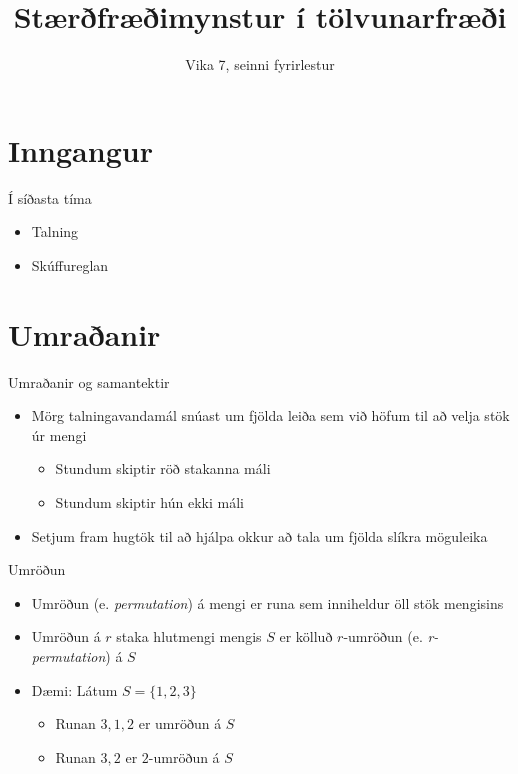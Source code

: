 \documentclass{beamer}
\title{Stærðfræðimynstur í tölvunarfræði}
\subtitle{Vika 7, seinni fyrirlestur}
\begin{document}
\begin{frame}
\titlepage
\end{frame}


\section{Inngangur}

\begin{frame}{Í síðasta tíma}
\begin{itemize}
 \item Talning
 \item Skúffureglan
\end{itemize}
\end{frame}

\section{Umraðanir}

\begin{frame}{Umraðanir og samantektir}
\begin{itemize}
 \item Mörg talningavandamál snúast um fjölda leiða sem við höfum til að velja stök úr mengi
 \begin{itemize}
  \item Stundum skiptir röð stakanna máli
  \item Stundum skiptir hún ekki máli
 \end{itemize}
 \item Setjum fram hugtök til að hjálpa okkur að tala um fjölda slíkra möguleika
\end{itemize}
\end{frame}

\begin{frame}{Umröðun}
\begin{itemize}
 \item Umröðun (e. \emph{permutation}) á mengi er runa sem inniheldur öll stök mengisins
 \item Umröðun á $r$ staka hlutmengi mengis $S$ er kölluð $r$-umröðun (e. \emph{r-permutation}) á $S$
 \item Dæmi: Látum $S = \{1, 2, 3\}$
 \begin{itemize}
  \item Runan $3, 1, 2$ er umröðun á $S$
  \item Runan $3, 2$ er $2$-umröðun á $S$
 \end{itemize}
\end{itemize}
\end{frame}
\end{document}
